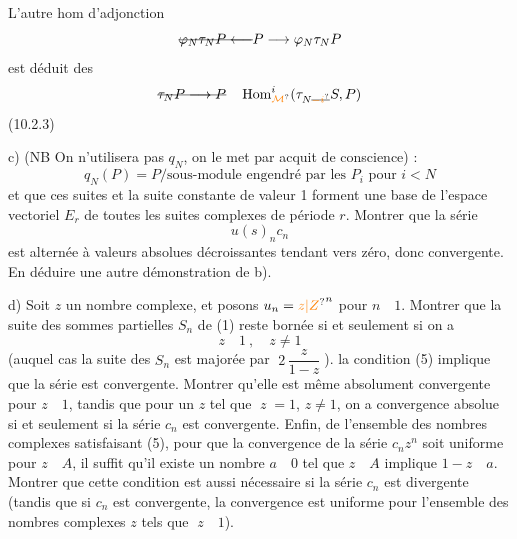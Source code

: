 L'autre hom d'adjonction
\[
\deleted{\varphi_N\tau_N P\longleftarrow}P\longrightarrow\varphi_N\tau_N P
\]
est déduit des  
\[
\deleted{\tau_N P\longrightarrow P}\quad \operatorname{Hom}_{\unsure{\mathcal M}}^{i}(\tau_{N\deleted{\unsure{-i}}}S,P)
\]
\noindent (10.2.3)

c) (NB On n'utilisera pas $q_N$, on le met par acquit de conscience) :
\[
q_N(P)=P/\text{sous-module engendré par les }P_i\text{ pour }i<N
\]
et que ces suites et la suite constante de valeur 1 forment une base de l'espace vectoriel $E_r$ de toutes les suites complexes de période $r$. Montrer que la série
\[
u(s)_n c_n
\]
est alternée à valeurs absolues décroissantes tendant vers zéro, donc convergente. En déduire une autre démonstration de b).

d) Soit $z$ un nombre complexe, et posons $u_n=\unsure{z|Z}^{n}$ pour $n\quad 1$. Montrer que la suite des sommes partielles $S_n$ de (1) reste bornée si et seulement si on a
\[
z\quad1\ ,\quad z\ne1\tag*{(5)}
\]
(auquel cas la suite des $S_n$ est majorée par $\;2\,\dfrac{z}{1-z}\;$).   la condition (5) implique que la série   est convergente. Montrer qu'elle est même absolument convergente pour $z\quad1$, tandis que pour un $z$ tel que $\;z\;=1$, $z\ne1$, on a convergence absolue si et seulement si la  série $c_n$ est convergente. Enfin,   de l'ensemble  des nombres complexes satisfaisant (5), pour que la convergence de la série $c_n z^n$ soit uniforme pour $z\quad A$, il suffit qu'il existe un nombre $a\quad0$ tel que $z\quad A$ implique $1-z\quad a$. Montrer que cette condition est aussi nécessaire si la série $c_n$ est divergente (tandis que si $c_n$ est convergente, la convergence est uniforme pour l'ensemble des nombres complexes $z$ tels que $\;z\quad1$). 

